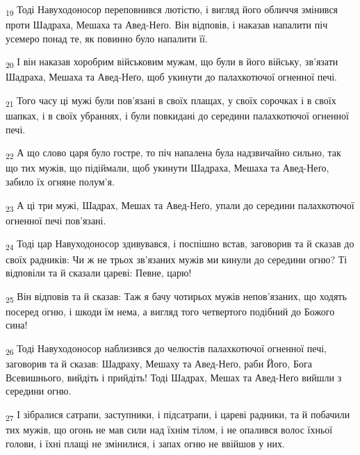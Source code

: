 \begin{tcolorbox}
\textsubscript{19} Тоді Навуходоносор переповнився лютістю, і вигляд його обличчя змінився проти Шадраха, Мешаха та Авед-Неґо. Він відповів, і наказав напалити піч усемеро понад те, як повинно було напалити її.
\end{tcolorbox}
\begin{tcolorbox}
\textsubscript{20} І він наказав хоробрим військовим мужам, що були в його війську, зв'язати Шадраха, Мешаха та Авед-Неґо, щоб укинути до палахкотючої огненної печі.
\end{tcolorbox}
\begin{tcolorbox}
\textsubscript{21} Того часу ці мужі були пов'язані в своїх плащах, у своїх сорочках і в своїх шапках, і в своїх убраннях, і були повкидані до середини палахкотючої огненної печі.
\end{tcolorbox}
\begin{tcolorbox}
\textsubscript{22} А що слово царя було гостре, то піч напалена була надзвичайно сильно, так що тих мужів, що підіймали, щоб укинути Шадраха, Мешаха та Авед-Неґо, забило їх огняне полум'я.
\end{tcolorbox}
\begin{tcolorbox}
\textsubscript{23} А ці три мужі, Шадрах, Мешах та Авед-Неґо, упали до середини палахкотючої огненної печі пов'язані.
\end{tcolorbox}
\begin{tcolorbox}
\textsubscript{24} Тоді цар Навуходоносор здивувався, і поспішно встав, заговорив та й сказав до своїх радників: Чи ж не трьох зв'язаних мужів ми кинули до середини огню? Ті відповіли та й сказали цареві: Певне, царю!
\end{tcolorbox}
\begin{tcolorbox}
\textsubscript{25} Він відповів та й сказав: Таж я бачу чотирьох мужів непов'язаних, що ходять посеред огню, і шкоди їм нема, а вигляд того четвертого подібний до Божого сина!
\end{tcolorbox}
\begin{tcolorbox}
\textsubscript{26} Тоді Навуходоносор наблизився до челюстів палахкотючої огненної печі, заговорив та й сказав: Шадраху, Мешаху та Авед-Неґо, раби Його, Бога Всевишнього, вийдіть і прийдіть! Тоді Шадрах, Мешах та Авед-Неґо вийшли з середини огню.
\end{tcolorbox}
\begin{tcolorbox}
\textsubscript{27} І зібралися сатрапи, заступники, і підсатрапи, і цареві радники, та й побачили тих мужів, що огонь не мав сили над їхнім тілом, і не опалився волос їхньої голови, і їхні плащі не змінилися, і запах огню не ввійшов у них.
\end{tcolorbox}
